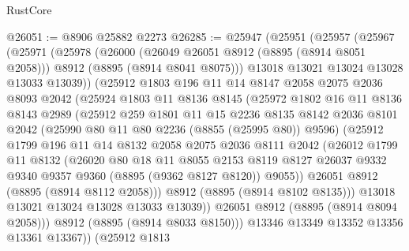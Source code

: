 \begin{lexlean}{RustCore}
\begin{coremodule}
@26051 := @8906 @25882 @2273
@26285 := @25947
    (@25951
      (@25957
        (@25967
          (@25971
            (@25978
              (@26000
                (@26049 @26051 @8912 (@8895 (@8914 @8051 @2058)))
                @8912
                (@8895 (@8914 @8041 @8075)))
              @13018
              @13021
              @13024
              @13028
              @13033
              @13039))
          (@25912
            @1803
            @196
            @11
            @14
            @8147
            @2058
            @2075
            @2036
            @8093
            @2042
            (@25924
              @1803
              @11
              @8136
              @8145
              (@25972
                @1802
                @16
                @11
                @8136
                @8143
                @2989
                (@25912
                  @259
                  @1801
                  @11
                  @15
                  @2236
                  @8135
                  @8142
                  @2036
                  @8101
                  @2042
                  (@25990 @80 @11 @80 @2236 (@8855 (@25995 @80)) @9596)
                  (@25912
                    @1799
                    @196
                    @11
                    @14
                    @8132
                    @2058
                    @2075
                    @2036
                    @8111
                    @2042
                    (@26012
                      @1799
                      @11
                      @8132
                      (@26020
                        @80
                        @18
                        @11
                        @8055
                        @2153
                        @8119
                        @8127
                        @26037
                        @9332
                        @9340
                        @9357
                        @9360
                        (@8895 (@9362 @8127 @8120))
                        @9055))
                    @26051
                    @8912
                    (@8895 (@8914 @8112 @2058)))
                  @8912
                  (@8895 (@8914 @8102 @8135)))
                @13018
                @13021
                @13024
                @13028
                @13033
                @13039))
            @26051
            @8912
            (@8895 (@8914 @8094 @2058)))
          @8912
          (@8895 (@8914 @8033 @8150)))
        @13346
        @13349
        @13352
        @13356
        @13361
        @13367))
    (@25912
      @1813

\end{coremodule}
\end{lexlean}
